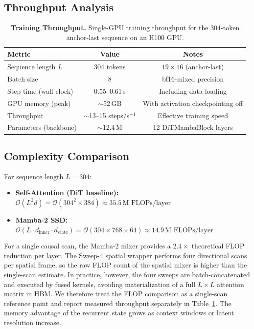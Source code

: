 \documentclass[12pt,letterpaper]{report}
\begin{document}
\subsection{Throughput Analysis}

\begin{table}[H]
\centering
\begin{tabular}{lcc}
\toprule
\textbf{Metric} & \textbf{Value} & \textbf{Notes} \\
\midrule
Sequence length $L$       & 304 tokens       & $19 \times 16$ (anchor-last) \\
Batch size                & 8                & bf16-mixed precision \\
Step time (wall clock)    & 0.55--0.61\,s    & Including data loading \\
GPU memory (peak)         & $\sim$52\,GB     & With activation checkpointing off \\
Throughput                & $\sim$13--15 steps/s$^{-1}$  & Effective training speed \\
Parameters (backbone)     & $\sim$12.4\,M    & 12 DiTMambaBlock layers \\
\bottomrule
\end{tabular}
\caption{\textbf{Training Throughput.} Single-GPU training throughput for the 304-token anchor-last sequence on an H100 GPU.}
\label{tab:throughput}
\end{table}

\subsection{Complexity Comparison}

For sequence length $L = 304$:
\begin{itemize}
    \item \textbf{Self-Attention (DiT baseline):} $\mathcal{O}(L^2 d) = \mathcal{O}(304^2 \times 384) \approx 35.5\,\text{M FLOPs/layer}$
    \item \textbf{Mamba-2 SSD:} $\mathcal{O}(L \cdot d_{\mathrm{inner}} \cdot d_{\mathrm{state}}) = \mathcal{O}(304 \times 768 \times 64) \approx 14.9\,\text{M FLOPs/layer}$
\end{itemize}

For a single causal scan, the Mamba-2 mixer provides a $2.4\times$ theoretical FLOP reduction per layer. The Sweep-4 spatial wrapper performs four directional scans per spatial frame, so the raw FLOP count of the spatial mixer is higher than the single-scan estimate. In practice, however, the four sweeps are batch-concatenated and executed by fused kernels, avoiding materialization of a full $L \times L$ attention matrix in HBM. We therefore treat the FLOP comparison as a single-scan reference point and report measured throughput separately in Table~\ref{tab:throughput}. The memory advantage of the recurrent state grows as context windows or latent resolution increase. %
\end{document}
